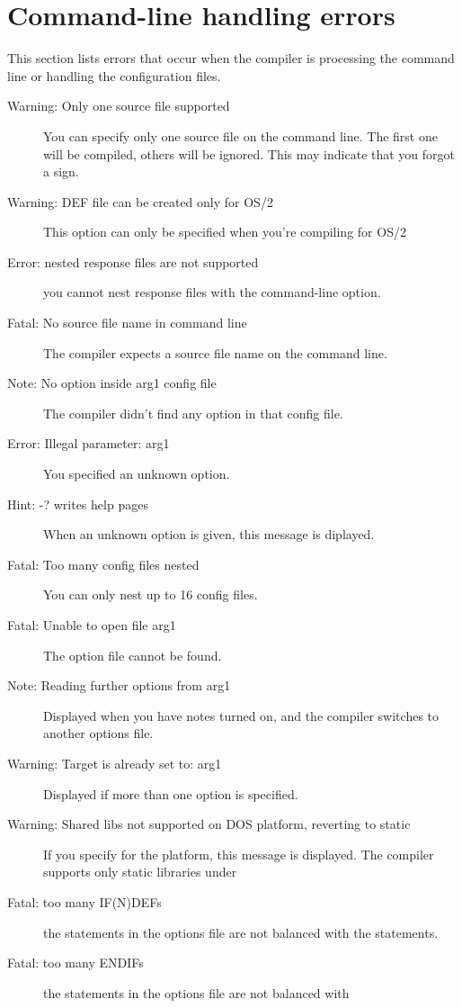  \section{Command-line handling errors}
 This section lists errors that occur when the compiler is processing the
 command line or handling the configuration files.
 \begin{description}
\item [Warning: Only one source file supported]
 You can specify only one source file on the command line. The first
 one will be compiled, others will be ignored. This may indicate that
 you forgot a  sign.
\item [Warning: DEF file can be created only for OS/2]
 This option can only be specified when you're compiling for OS/2
\item [Error: nested response files are not supported]
 you cannot nest response files with the  command-line option.
\item [Fatal: No source file name in command line]
 The compiler expects a source file name on the command line.
\item [Note: No option inside arg1 config file]
 The compiler didn't find any option in that config file.
\item [Error: Illegal parameter: arg1]
 You specified an unknown option.
\item [Hint: -? writes help pages]
 When an unknown option is given, this message is diplayed.
\item [Fatal: Too many config files nested]
 You can only nest up to 16 config files.
\item [Fatal: Unable to open file arg1]
 The option file cannot be found.
\item [Note: Reading further options from arg1]
 Displayed when you have notes turned on, and the compiler switches
 to another options file.
\item [Warning: Target is already set to: arg1]
 Displayed if more than one  option is specified.
\item [Warning: Shared libs not supported on DOS platform, reverting to static]
 If you specify  for the \dos platform, this message is displayed.
 The compiler supports only static libraries under \dos
\item [Fatal: too many IF(N)DEFs]
 the  statements in the options file are not balanced with
 the  statements.
\item [Fatal: too many ENDIFs]
 the  statements in the options file are not balanced with

\end{description}
